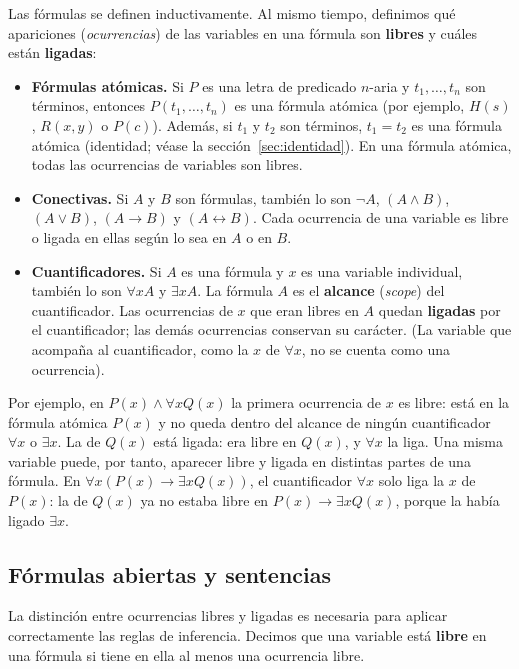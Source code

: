 \noindent Las fórmulas se definen inductivamente. Al mismo tiempo, definimos qué apariciones (\emph{ocurrencias}) de las variables en una fórmula son \textbf{libres} y cuáles están \textbf{ligadas}:
\begin{itemize}
    \item \textbf{Fórmulas atómicas.} Si $P$ es una letra de predicado $n$-aria y $t_1, \dots, t_n$ son términos, entonces $P(t_1, \dots, t_n)$ es una fórmula atómica (por ejemplo, $H(s)$, $R(x, y)$ o $P(c)$). Además, si $t_1$ y $t_2$ son términos, $t_1 = t_2$ es una fórmula atómica (identidad; véase la sección~\ref{sec:identidad}). En una fórmula atómica, todas las ocurrencias de variables son libres.
    \item \textbf{Conectivas.} Si $A$ y $B$ son fórmulas, también lo son $\neg A$, $(A \land B)$, $(A \lor B)$, $(A \to B)$ y $(A \leftrightarrow B)$. Cada ocurrencia de una variable es libre o ligada en ellas según lo sea en $A$ o en $B$.
    \item \textbf{Cuantificadores.} Si $A$ es una fórmula y $x$ es una variable individual, también lo son $\forall x A$ y $\exists x A$. La fórmula $A$ es el \textbf{alcance} (\emph{scope}) del cuantificador. Las ocurrencias de $x$ que eran libres en $A$ quedan \textbf{ligadas} por el cuantificador; las demás ocurrencias conservan su carácter. (La variable que acompaña al cuantificador, como la $x$ de $\forall x$, no se cuenta como una ocurrencia).
\end{itemize}
Por ejemplo, en $P(x) \land \forall x Q(x)$ la primera ocurrencia de $x$ es libre: está en la fórmula atómica $P(x)$ y no queda dentro del alcance de ningún cuantificador $\forall x$ o $\exists x$. La de $Q(x)$ está ligada: era libre en $Q(x)$, y $\forall x$ la liga. Una misma variable puede, por tanto, aparecer libre y ligada en distintas partes de una fórmula. En $\forall x (P(x) \to \exists x Q(x))$, el cuantificador $\forall x$ solo liga la $x$ de $P(x)$: la de $Q(x)$ ya no estaba libre en $P(x) \to \exists x Q(x)$, porque la había ligado $\exists x$.

\subsection{Fórmulas abiertas y sentencias}

La distinción entre ocurrencias libres y ligadas es necesaria para aplicar correctamente las reglas de inferencia. Decimos que una variable está \textbf{libre} en una fórmula si tiene en ella al menos una ocurrencia libre.

